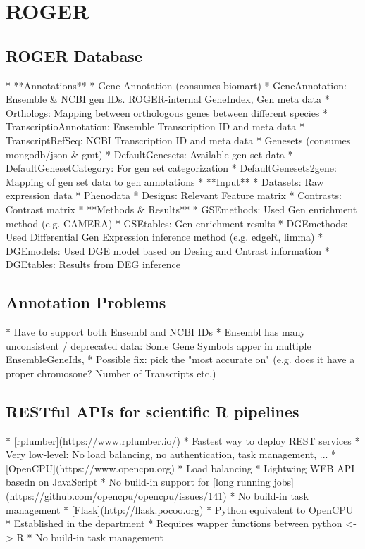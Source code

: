 \section{ROGER}

\subsection{ROGER Database}

* **Annotations**
* Gene Annotation (consumes biomart)
* GeneAnnotation: Ensemble \& NCBI gen IDs. ROGER-internal GeneIndex, Gen meta data
* Orthologs: Mapping between orthologous genes between different species
* TranscriptioAnnotation: Ensemble Transcription ID and meta data
* TranscriptRefSeq: NCBI Transcription ID and meta data
* Genesets (consumes mongodb/json \& gmt)
* DefaultGenesets: Available gen set data
* DefaultGenesetCategory: For gen set categorization
* DefaultGenesets2gene: Mapping of gen set data to gen annotations
* **Input**
* Datasets: Raw expression data
* Phenodata
* Designs: Relevant Feature matrix
* Contrasts: Contrast matrix
* **Methods \& Results**
* GSEmethods: Used Gen enrichment method (e.g. CAMERA)
* GSEtables: Gen enrichment results
* DGEmethods: Used Differential Gen Expression inference method (e.g.  edgeR, limma)
* DGEmodels: Used DGE model based on Desing and Cntrast information
* DGEtables: Results from DEG inference

\subsection{Annotation Problems}

* Have to support both Ensembl and NCBI IDs
* Ensembl has many unconsistent / deprecated data: Some Gene Symbols apper in multiple EnsembleGeneIds, 
* Possible fix: pick the "most accurate on" (e.g. does it have a proper chromosone? Number of Transcripts etc.)


\subsection{RESTful APIs for scientific R pipelines}

* [rplumber](https://www.rplumber.io/)
* Fastest way to deploy REST services
* Very low-level: No load balancing, no authentication, task management, ...
* [OpenCPU](https://www.opencpu.org)
* Load balancing
* Lightwing WEB API basedn on JavaScript
* No build-in support for [long running jobs]
(https://github.com/opencpu/opencpu/issues/141)
* No build-in task management
* [Flask](http://flask.pocoo.org)
* Python equivalent to OpenCPU
* Established in the department
* Requires wapper functions between python <-> R
* No build-in task management


